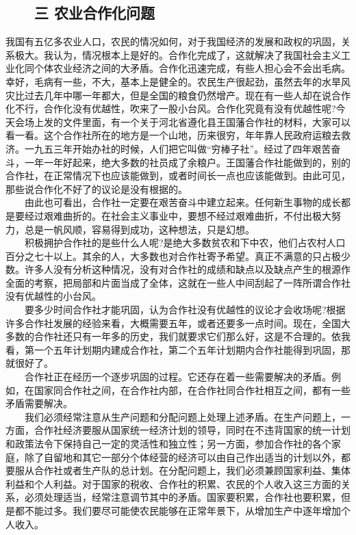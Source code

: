 \documentclass[cn,11pt,chinese]{elegantbook}
\def\myformat#1{\hfil\hfil #1}
\begin{document}
\subsection*{\myformat{　　三 农业合作化问题}}
我国有五亿多农业人口，农民的情况如何，对于我国经济的发展和政权的巩固，关系极大。我认为，情况根本上是好的。合作化完成了，这就解决了我国社会主义工业化同个体农业经济之间的大矛盾。合作化迅速完成，有些人担心会不会出毛病。幸好，毛病有一些，不大，基本上是健全的。农民生产很起劲，虽然去年的水旱风灾比过去几年中哪一年都大，但是全国的粮食仍然增产。现在有一些人却在说合作化不行，合作化没有优越性，吹来了一股小台风。合作化究竟有没有优越性呢?今天会场上发的文件里面，有一个关于河北省遵化县王国藩合作社的材料，大家可以看一看。这个合作社所在的地方是一个山地，历来很穷，年年靠人民政府运粮去救济。一九五三年开始办社的时候，人们把它叫做“穷棒子社”。经过了四年艰苦奋斗，一年一年好起来，绝大多数的社员成了余粮户。王国藩合作社能做到的，别的合作社，在正常情况下也应该能做到，或者时间长一点也应该能做到。由此可见，那些说合作化不好了的议论是没有根据的。\\
　　由此也可看出，合作社一定要在艰苦奋斗中建立起来。任何新生事物的成长都是要经过艰难曲折的。在社会主义事业中，要想不经过艰难曲折，不付出极大努力，总是一帆风顺，容易得到成功，这种想法，只是幻想。\\
　　积极拥护合作社的是些什么人呢?是绝大多数贫农和下中农，他们占农村人口百分之七十以上。其余的人，大多数也对合作社寄予希望。真正不满意的只占极少数。许多人没有分析这种情况，没有对合作社的成绩和缺点以及缺点产生的根源作全面的考察，把局部和片面当成了全体，这就在一些人中间刮起了一阵所谓合作社没有优越性的小台风。\\
　　要多少时间合作社才能巩固，认为合作社没有优越性的议论才会收场呢?根据许多合作社发展的经验来看，大概需要五年，或者还要多一点时间。现在，全国大多数的合作社还只有一年多的历史，我们就要求它们那么好，这是不合理的。依我看，第一个五年计划期内建成合作社，第二个五年计划期内合作社能得到巩固，那就很好了。\\
　　合作社正在经历一个逐步巩固的过程。它还存在着一些需要解决的矛盾。例如，在国家同合作社之间，在合作社内部，在合作社同合作社相互之间，都有一些矛盾需要解决。\\
　　我们必须经常注意从生产问题和分配问题上处理上述矛盾。在生产问题上，一方面，合作社经济要服从国家统一经济计划的领导，同时在不违背国家的统一计划和政策法令下保持自己一定的灵活性和独立性；另一方面，参加合作社的各个家庭，除了自留地和其它一部分个体经营的经济可以由自己作出适当的计划以外，都要服从合作社或者生产队的总计划。在分配问题上，我们必须兼顾国家利益、集体利益和个人利益。对于国家的税收、合作社的积累、农民的个人收入这三方面的关系，必须处理适当，经常注意调节其中的矛盾。国家要积累，合作社也要积累，但是都不能过多。我们要尽可能使农民能够在正常年景下，从增加生产中逐年增加个人收入。\\
\end{document}
